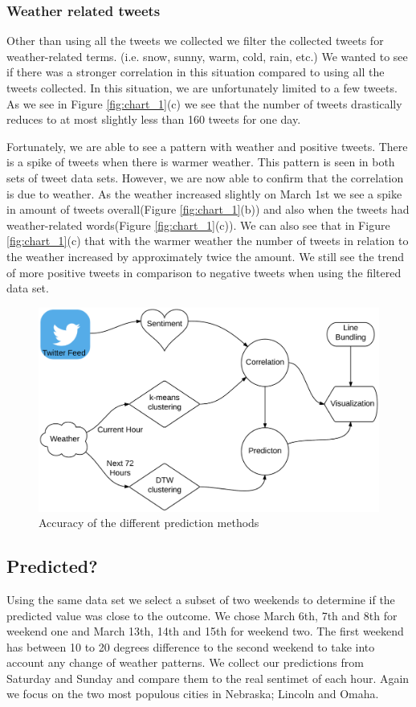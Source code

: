 \documentclass[journal]{vgtc}                %
\begin{document}
\subsubsection{Weather related tweets}
Other than using all the tweets we collected we filter the collected tweets for weather-related terms. (i.e. snow, sunny, warm, cold, rain, etc.) We wanted to see if there was a stronger correlation in this situation compared to using all the tweets collected. In this situation, we are unfortunately limited to a few tweets. As we see in Figure \ref{fig:chart_1}(c) we see that the number of tweets drastically reduces to at most slightly less than 160 tweets for one day. 

Fortunately, we are able to see a pattern with weather and positive tweets. There is a spike of tweets when there is warmer weather. This pattern is seen in both sets of tweet data sets. However, we are now able to confirm that the correlation is due to weather. As the weather increased slightly on March 1st we see a spike in amount of tweets overall(Figure \ref{fig:chart_1}(b)) and also when the tweets had weather-related words(Figure \ref{fig:chart_1}(c)). We can also see that in Figure \ref{fig:chart_1}(c) that with the warmer weather the number of tweets in relation to the weather increased by approximately twice the amount. We still see the trend of more positive tweets in comparison to negative tweets when using the filtered data set.

\begin{figure}[htb]
 \centering
 \includegraphics[scale=0.1]{steps}
 \caption{Accuracy of the different prediction methods}
 \label{fig:predict}
\end{figure}

\subsection{Predicted?}
Using the same data set we select a subset of two weekends to determine if the predicted value was close to the outcome. We chose March 6th, 7th and 8th for weekend one and March 13th, 14th and 15th for weekend two. The first weekend has between 10 to 20 degrees difference to the second weekend to take into account any change of weather patterns. We collect our predictions from Saturday and Sunday and compare them to the real sentimet of each hour. Again we focus on the two most populous cities in Nebraska; Lincoln and Omaha.
\end{document}
